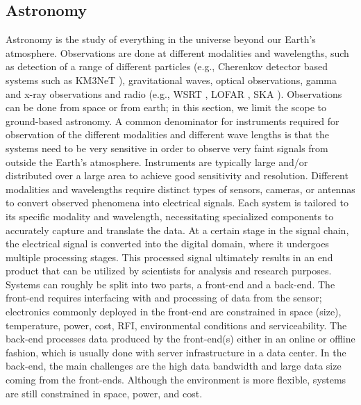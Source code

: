 \subsection{Astronomy}
\label{sec:astr}

Astronomy is the study of everything in the universe beyond our Earth's atmosphere. Observations are done at different modalities and wavelengths, such as detection of a range of different particles (e.g., Cherenkov detector based systems such as KM3NeT \cite{KM3NeT:2009xxi}), gravitational waves, optical observations, gamma and x-ray observations and radio (e.g., WSRT \cite{van_Cappellen_2022}, LOFAR \cite{van_Haarlem_2013}, SKA \cite{book-SKA}). Observations can be done from space or from earth; in this section, we limit the scope to ground-based astronomy. A common denominator for instruments required for observation of the different modalities and different wave lengths is that the systems need to be very sensitive in order to observe very faint signals from outside the Earth's atmosphere. Instruments are typically large and/or distributed over a large area %
to achieve %
good sensitivity and resolution. Different modalities and wavelengths require distinct types of sensors, cameras, or antennas to convert observed phenomena into electrical signals. Each system is tailored to its specific modality and wavelength, necessitating specialized components to accurately capture and translate the data. %
At a certain stage in the signal chain, the electrical signal is converted into the digital domain, where it undergoes multiple processing stages. This processed signal ultimately results in an end product that can be utilized by scientists for analysis and research purposes.
Systems can roughly be split into two parts, a front-end and a back-end. The front-end requires interfacing with and processing of data from the sensor; electronics commonly deployed in the front-end are constrained in space (size), temperature, power, cost, RFI, environmental conditions and serviceability. The back-end processes data produced by the front-end(s) either in an online or offline fashion, which is usually %
done with server infrastructure in a data center. %
In the back-end, the main challenges are the high data bandwidth and large data size coming from the front-ends. Although the environment is more flexible, systems are still constrained in space, power, and cost.

